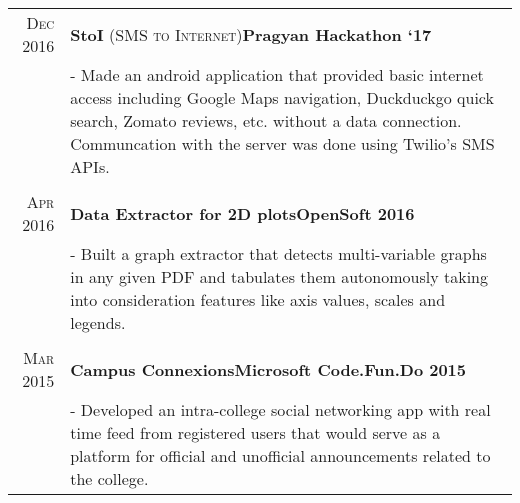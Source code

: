 \documentclass[a4paper,10pt]{extarticle} %
\begin{document}
\begin{tabular}{r|p{17.5cm}}

\textsc{Dec 2016} & \textbf{StoI} \textsc{(SMS to Internet)}\hfill\textbf{Pragyan Hackathon `17}\\
& \footnotesize{- Made an android application that provided basic internet access including Google Maps navigation, Duckduckgo quick search, Zomato reviews, etc. without a data connection. Communcation with the server was done using Twilio's SMS APIs.}\\
\multicolumn{2}{c}{} \\

\textsc{Apr 2016} & \textbf{Data Extractor for 2D plots}\hfill\textbf{OpenSoft 2016}\\
& \footnotesize{- Built a graph extractor that detects multi-variable graphs in any given PDF and tabulates them autonomously taking into consideration features like axis values, scales and legends.}\\
\multicolumn{2}{c}{} \\

\textsc{Mar 2015} & \textbf{Campus Connexions}\hfill\textbf{Microsoft Code.Fun.Do 2015}\\
& \footnotesize{- Developed an intra-college social networking app with real time feed from registered users that would serve as a platform for official and unofficial announcements related to the college.}\\

\end{tabular}
\end{document}
